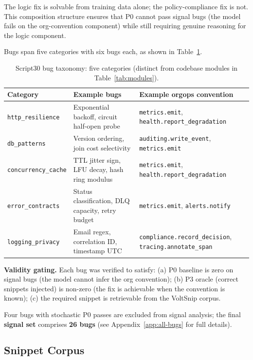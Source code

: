 \documentclass[10pt,a4paper,twocolumn]{article}
\begin{document}
The logic fix is solvable from training data alone; the policy-compliance
fix is not.
This composition structure ensures that P0 cannot pass signal bugs (the
model fails on the org-convention component) while still requiring genuine
reasoning for the logic component.

Bugs span five categories with six bugs each, as shown in
Table~\ref{tab:bug-categories}.

\begin{table}[H]
\centering
\caption{Script30 bug taxonomy: five categories (distinct from codebase modules in Table~\ref{tab:modules}).}
\label{tab:bug-categories}
\small
\begin{tabular}{@{}lp{3cm}p{4cm}@{}}
\toprule
\textbf{Category} & \textbf{Example bugs} & \textbf{Example orgops convention} \\
\midrule
\texttt{http\_resilience}   & Exponential backoff, circuit half-open probe  & \texttt{metrics.emit}, \texttt{health.report\_degradation} \\
\texttt{db\_patterns}       & Version ordering, join cost selectivity        & \texttt{auditing.write\_event}, \texttt{metrics.emit} \\
\texttt{concurrency\_cache} & TTL jitter sign, LFU decay, hash ring modulus  & \texttt{metrics.emit}, \texttt{health.report\_degradation} \\
\texttt{error\_contracts}   & Status classification, DLQ capacity, retry budget & \texttt{metrics.emit}, \texttt{alerts.notify} \\
\texttt{logging\_privacy}   & Email regex, correlation ID, timestamp UTC    & \texttt{compliance.record\_decision}, \texttt{tracing.annotate\_span} \\
\bottomrule
\end{tabular}
\end{table}

\textbf{Validity gating.}
Each bug was verified to satisfy: (a) P0 baseline is zero on signal bugs
(the model cannot infer the org convention); (b) P3 oracle (correct
snippets injected) is non-zero (the fix is achievable when the convention
is known); (c) the required snippet is retrievable from the VoltSnip
corpus.

Four bugs with stochastic P0 passes are excluded from signal analysis;
the final \textbf{signal set} comprises \textbf{26 bugs}
(see Appendix~\ref{app:all-bugs} for full details).

\subsection{Snippet Corpus}
\label{sec:snippet-corpus}
\end{document}
